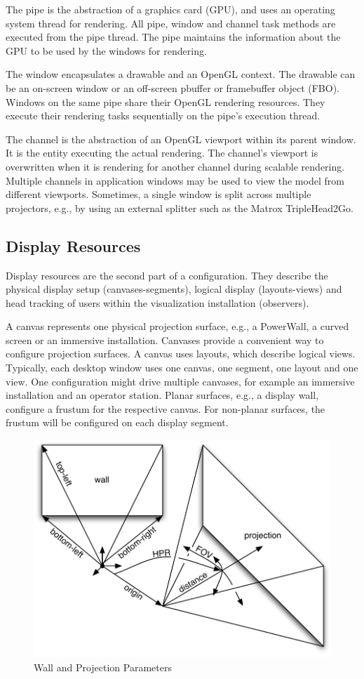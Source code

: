 The \textsf{pipe} is the abstraction of a graphics card (GPU), and uses an
operating system thread for rendering. All pipe, window and channel task methods
are executed from the pipe thread. The pipe maintains the information about the
GPU to be used by the windows for rendering.

The \textsf{window} encapsulates a drawable and an OpenGL context. The drawable
can be an on-screen window or an off-screen pbuffer or framebuffer object (FBO).
Windows on the same pipe share their OpenGL rendering resources. They execute
their rendering tasks sequentially on the pipe's execution thread.

The \textsf{channel} is the abstraction of an OpenGL viewport within its parent
window. It is the entity executing the actual rendering. The channel's viewport
is overwritten when it is rendering for another channel during scalable
rendering. Multiple channels in application windows may be used to view the
model from different viewports. Sometimes, a single window is split across
multiple projectors, e.g., by using an external splitter such as the Matrox
TripleHead2Go.


\subsection{Display Resources}

Display resources are the second part of a configuration. They describe the
physical display setup (canvases-segments), logical display (layouts-views) and
head tracking of users within the visualization installation (observers).

A \textsf{canvas} represents one physical projection surface, e.g., a PowerWall,
a curved screen or an immersive installation. Canvases provide a convenient way
to configure projection surfaces. A canvas uses layouts, which describe logical
views. Typically, each desktop window uses one canvas, one segment, one layout
and one view. One configuration might drive multiple canvases, for example an
immersive installation and an operator station. Planar surfaces, e.g., a display
wall, configure a frustum for the respective canvas. For non-planar surfaces,
the frustum will be configured on each display segment.

\begin{figure}
 \includegraphics[width=.618\textwidth]{images/frusta.pdf}
 {\caption{\label{fFrusta}Wall and Projection Parameters}}
\end{figure}

